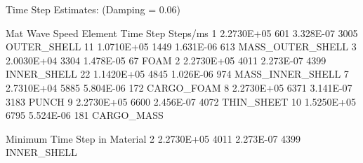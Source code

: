      Time Step Estimates:
        (Damping = 0.06)

     Mat  Wave Speed  Element     Time Step    Steps/ms
      1   2.2730E+05      601     3.328E-07        3005    OUTER_SHELL
     11   1.0710E+05     1449     1.631E-06         613    MASS_OUTER_SHELL
      3   2.0030E+04     3304     1.478E-05          67    FOAM
      2   2.2730E+05     4011     2.273E-07        4399    INNER_SHELL
     22   1.1420E+05     4845     1.026E-06         974    MASS_INNER_SHELL
      7   2.7310E+04     5885     5.804E-06         172    CARGO_FOAM
      8   2.2730E+05     6371     3.141E-07        3183    PUNCH
      9   2.2730E+05     6600     2.456E-07        4072    THIN_SHEET
     10   1.5250E+05     6795     5.524E-06         181    CARGO_MASS

     Minimum Time Step in Material 2
          2.2730E+05     4011     2.273E-07        4399    INNER_SHELL
